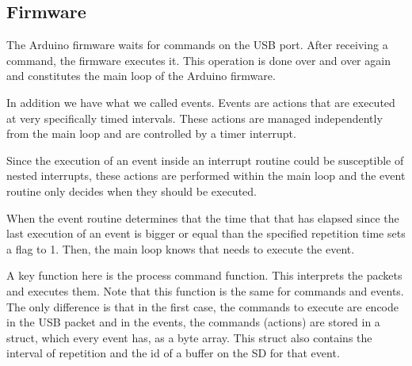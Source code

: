 \documentclass[12pt,a4paper]{report}
\begin{document}
\subsection*{Firmware}

The Arduino firmware waits for commands on the USB port. After receiving a command, the firmware executes it. This operation is done over and over again and constitutes the main loop of the Arduino firmware.

In addition we have what we called events. Events are actions that are executed at very specifically timed intervals. These actions are managed independently from the main loop and are controlled by a timer interrupt.

Since the execution of an event inside an interrupt routine could be susceptible of nested interrupts, these actions are performed within the main loop and the event routine only decides when they should be executed.

When the event routine determines that the time that that has elapsed since the last execution of an event is bigger or equal than the specified repetition time sets a flag to 1. Then, the main loop knows that needs to execute the event.

A key function here is the process command function. This interprets the packets and executes them. Note that this function is the same for commands and events. The only difference is that in the first case, the commands to execute are encode in the USB packet and in the events, the commands (actions) are stored in a struct, which every event has, as a byte array. This struct also contains the interval of repetition and the id of a buffer on the SD for that event.
\end{document}
